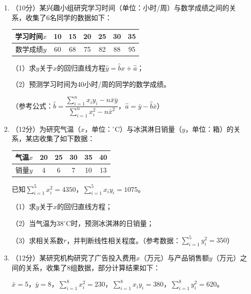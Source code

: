 \documentclass[12pt, a4paper]{ctexart}
\begin{document}
\begin{enumerate}[label=\textbf{\arabic*.}, leftmargin=2em, resume]

\item（10分）某兴趣小组研究学习时间（单位：小时/周）与数学成绩之间的关系，收集了6名同学的数据如下：

\begin{center}
\begin{tabular}{|c|c|c|c|c|c|c|}
\hline
学习时间$x$ & 10 & 15 & 20 & 25 & 30 & 35 \\
\hline
数学成绩$y$ & 60 & 68 & 75 & 82 & 88 & 95 \\
\hline
\end{tabular}
\end{center}

（1）求$y$关于$x$的回归直线方程$\hat{y} = \hat{b}x + \hat{a}$；

（2）预测学习时间为40小时/周的同学的数学成绩。

（参考公式：$\hat{b} = \dfrac{\displaystyle\sum_{i=1}^{n} x_i y_i - n\bar{x}\bar{y}}{\displaystyle\sum_{i=1}^{n} x_i^2 - n\bar{x}^2}$，$\hat{a} = \bar{y} - \hat{b}\bar{x}$）

\item（12分）为研究气温（$x$，单位：$^\circ\text{C}$）与冰淇淋日销量（$y$，单位：箱）的关系，某店收集了如下数据：

\begin{center}
\begin{tabular}{|c|c|c|c|c|c|}
\hline
气温$x$ & 20 & 25 & 30 & 35 & 40 \\
\hline
销量$y$ & 4 & 6 & 7 & 10 & 13 \\
\hline
\end{tabular}
\end{center}

已知$\sum_{i=1}^{5} x_i^2 = 4350$，$\sum_{i=1}^{5} x_i y_i = 1075$。

（1）求$y$关于$x$的回归直线方程；

（2）当气温为$38^\circ\text{C}$时，预测冰淇淋的日销量；

（3）求相关系数$r$，并判断线性相关程度。（参考数据：$\sum_{i=1}^{5} y_i^2 = 350$）

\item（12分）某研究机构研究了广告投入费用$x$（万元）与产品销售额$y$（万元）之间的关系，收集了8组数据，部分计算结果如下：

$\bar{x} = 5$，$\bar{y} = 8$，$\sum_{i=1}^{8} x_i^2 = 230$，$\sum_{i=1}^{8} x_i y_i = 380$，$\sum_{i=1}^{8} y_i^2 = 620$。


\end{enumerate}
\end{document}
